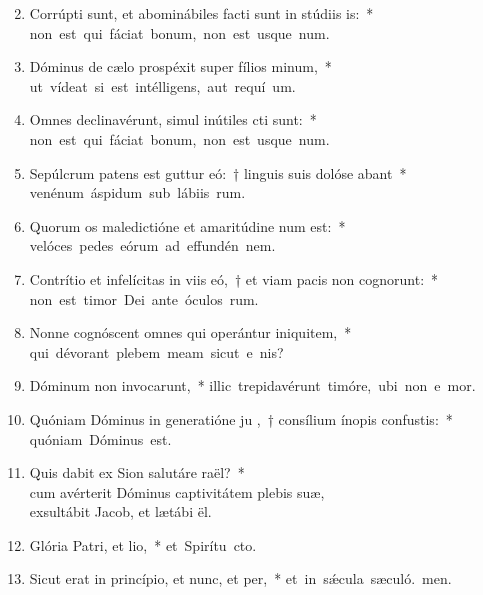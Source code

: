 \begin{flushleft}
\begin{enumerate}[leftmargin=*]
\setcounter{enumi}{1}


\item Corrúpti sunt, et abominábiles facti sunt in stúdiis is:~* \mbox{non est qui fáciat bonum, non est usque  num.}
\item Dóminus de cælo prospéxit super fílios minum,~* \mbox{ut vídeat si est intélligens, aut requí um.}
\item Omnes declinavérunt, simul inútiles cti sunt:~* \mbox{non est qui fáciat bonum, non est usque  num.}
\item Sepúlcrum patens est guttur eó:~† linguis suis dolóse abant~* \mbox{venénum áspidum sub lábiis rum.}
\item Quorum os maledictióne et amaritúdine num est:~* \mbox{velóces pedes eórum ad effundén nem.}
\item Contrítio et infelícitas in viis eó,~† et viam pacis non cognorunt:~* \mbox{non est timor Dei ante óculos rum.}
\item Nonne cognóscent omnes qui operántur iniquitem,~* \mbox{qui dévorant plebem meam sicut e nis?}
\item Dóminum non invocarunt,~* \mbox{illic trepidavérunt timóre, ubi non e mor.}
\item Quóniam Dóminus in generatióne ju ,~† consílium ínopis confustis:~* \mbox{quóniam Dóminus   est.}
\item \sloppy Quis dabit ex Sion salutáre raël?~* \\cum avérterit Dóminus captivitátem plebis suæ, \\exsultábit Jacob, et lætábi ël.
\item Glória Patri, et lio,~* \mbox{et Spirítu cto.}
\item Sicut erat in princípio, et nunc, et per,~* \mbox{et in s\'{\ae}cula sæculó. men.}


\end{enumerate}
\end{flushleft}

